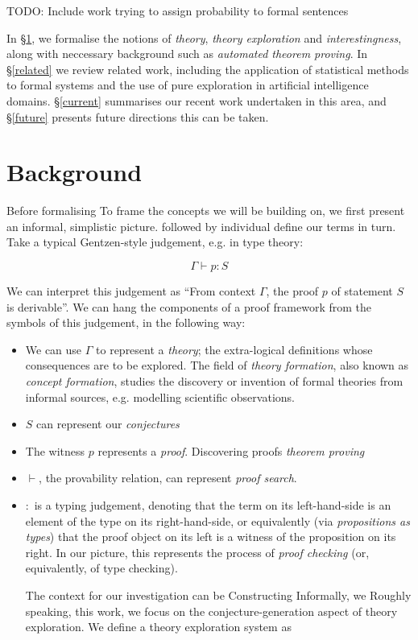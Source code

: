 \documentclass[]{article}
\begin{document}
TODO: Include work trying to assign probability to formal sentences

In \S\ref{background}, we formalise the notions of \emph{theory}, \emph{theory exploration} and \emph{interestingness}, along with neccessary background such as \emph{automated theorem proving}. In \S\ref{related} we review related work, including the application of statistical methods to formal systems and the use of pure exploration in artificial intelligence domains. \S\ref{current} summarises our recent work undertaken in this area, and \S\ref{future} presents future directions this can be taken.

\section{Background}
\label{background}

\iffalse

Before formalising To frame the concepts we will be building on, we first present an informal, simplistic picture. followed by individual define our terms in turn. Take a typical Gentzen-style judgement, e.g. in type theory:

\[\Gamma \vdash p : S\]

We can interpret this judgement as ``From context $\Gamma$, the proof $p$ of statement $S$ is derivable''. We can hang the components of a proof framework from the symbols of this judgement, in the following way:

\begin{itemize}
  \item We can use $\Gamma$ to represent a \emph{theory}; the extra-logical definitions whose consequences are to be explored. The field of \emph{theory formation}, also known as \emph{concept formation}, studies the discovery or invention of formal theories from informal sources, e.g. modelling scientific observations.
  \item $S$ can represent our \emph{conjectures}
  \item The witness $p$ represents a \emph{proof}. Discovering proofs \emph{theorem proving}
  \item $\vdash$, the provability relation, can represent \emph{proof search}.
  \item $:$ is a typing judgement, denoting that the term on its left-hand-side is an element of the type on its right-hand-side, or equivalently (via \emph{propositions as types}) that the proof object on its left is a witness of the proposition on its right. In our picture, this represents the process of \emph{proof checking} (or, equivalently, of type checking).

The context for our investigation can be Constructing  Informally, we Roughly speaking,  this work, we focus on the conjecture-generation aspect of theory exploration. We define a theory exploration system as
\end{itemize}
\end{document}
